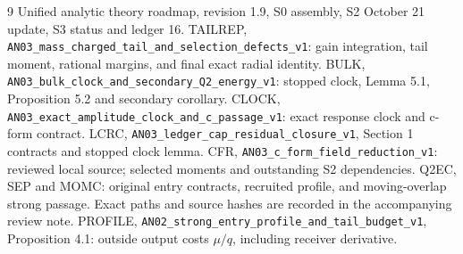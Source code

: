 \documentclass[11pt]{article}
\theoremstyle{remark}\newtheorem{remark}[proposition]{Remark}
\begin{document}
\begin{thebibliography}{9}\small
{} Unified analytic theory roadmap, revision 1.9,
S0 assembly, S2 October 21 update, S3 status and ledger 16.
 TAILREP, \texttt{AN03\_mass\_charged\_tail\_and\_selection\_defects\_v1}:
gain integration, tail moment, rational margins, and final exact radial identity.
 BULK, \texttt{AN03\_bulk\_clock\_and\_secondary\_Q2\_energy\_v1}:
stopped clock, Lemma 5.1, Proposition 5.2 and secondary corollary.
 CLOCK, \texttt{AN03\_exact\_amplitude\_clock\_and\_c\_passage\_v1}:
exact response clock and c-form contract.
 LCRC, \texttt{AN03\_ledger\_cap\_residual\_closure\_v1},
Section 1 contracts and stopped clock lemma.
 CFR, \texttt{AN03\_c\_form\_field\_reduction\_v1}:
reviewed local source; selected moments and outstanding S2 dependencies.
 Q2EC, SEP and MOMC: original entry contracts,
recruited profile, and moving-overlap strong passage. Exact paths
and source hashes are recorded in the accompanying review note.
 PROFILE, \texttt{AN02\_strong\_entry\_profile\_and\_tail\_budget\_v1},
Proposition 4.1: outside output costs $\mu/q$, including receiver derivative.
\end{thebibliography}
\end{document}
